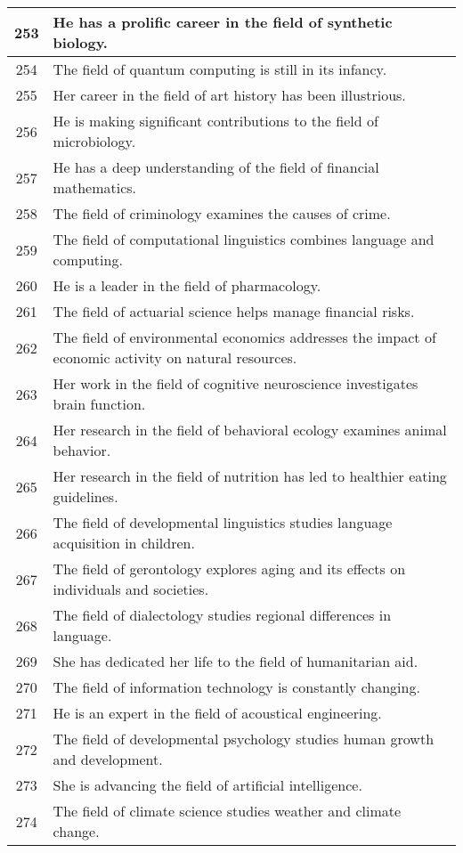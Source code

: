 \begin{longtable}{|c|p{12cm}|}
253 & He has a prolific career in the field of synthetic biology. \\ \hline
254 & The field of quantum computing is still in its infancy. \\ \hline
255 & Her career in the field of art history has been illustrious. \\ \hline
256 & He is making significant contributions to the field of microbiology. \\ \hline
257 & He has a deep understanding of the field of financial mathematics. \\ \hline
258 & The field of criminology examines the causes of crime. \\ \hline
259 & The field of computational linguistics combines language and computing. \\ \hline
260 & He is a leader in the field of pharmacology. \\ \hline
261 & The field of actuarial science helps manage financial risks. \\ \hline
262 & The field of environmental economics addresses the impact of economic activity on natural resources. \\ \hline
263 & Her work in the field of cognitive neuroscience investigates brain function. \\ \hline
264 & Her research in the field of behavioral ecology examines animal behavior. \\ \hline
265 & Her research in the field of nutrition has led to healthier eating guidelines. \\ \hline
266 & The field of developmental linguistics studies language acquisition in children. \\ \hline
267 & The field of gerontology explores aging and its effects on individuals and societies. \\ \hline
268 & The field of dialectology studies regional differences in language. \\ \hline
269 & She has dedicated her life to the field of humanitarian aid. \\ \hline
270 & The field of information technology is constantly changing. \\ \hline
271 & He is an expert in the field of acoustical engineering. \\ \hline
272 & The field of developmental psychology studies human growth and development. \\ \hline
273 & She is advancing the field of artificial intelligence. \\ \hline
274 & The field of climate science studies weather and climate change. \\ \hline

\end{longtable}
